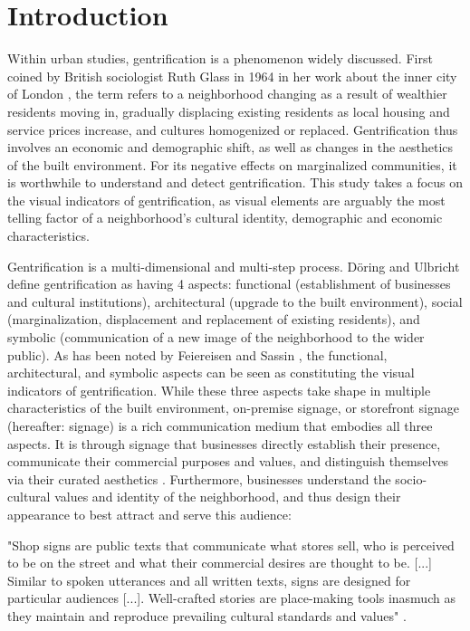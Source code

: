 \section{Introduction}
\label{sec:introduction}

Within urban studies, gentrification is a phenomenon widely discussed. First coined by British sociologist Ruth Glass in 1964 in her work about the inner city of London \cite{Glass1964}, the term refers to a neighborhood changing as a result of wealthier residents moving in, gradually displacing existing residents as local housing and service prices increase, and cultures homogenized or replaced. Gentrification thus involves an economic and demographic shift, as well as changes in the aesthetics of the built environment. For its negative effects on marginalized communities, it is worthwhile to understand and detect gentrification. This study takes a focus on the visual indicators of gentrification, as visual elements are arguably the most telling factor of a neighborhood’s cultural identity, demographic and economic characteristics.

Gentrification is a multi-dimensional and multi-step process. Döring and Ulbricht \cite{döring_ulbricht_2018} define gentrification as having 4 aspects: functional (establishment of businesses and cultural institutions), architectural (upgrade to the built environment), social (marginalization, displacement and replacement of existing residents), and symbolic (communication of a new image of the neighborhood to the wider public). As has been noted by Feiereisen and Sassin \cite{feiereisen_sounding_2021}, the functional, architectural, and symbolic aspects can be seen as constituting the visual indicators of gentrification. While these three aspects take shape in multiple characteristics of the built environment, on-premise signage, or storefront signage (hereafter: signage) is a rich communication medium that embodies all three aspects. It is through signage that businesses directly establish their presence, communicate their commercial purposes and values, and distinguish themselves via their curated aesthetics \cite{rahman_signage_2020}. Furthermore, businesses understand the socio-cultural values and identity of the neighborhood, and thus design their appearance to best attract and serve this audience:

\begin{displayquote}
    "Shop signs are public texts that communicate what stores sell, who is perceived to be on the street and what their commercial desires are thought to be. [...] Similar to spoken utterances and all written texts, signs are designed for particular audiences [...]. Well-crafted stories are place-making tools inasmuch as they maintain and reproduce prevailing cultural standards and values" \cite{trinch_signsays_2017}. 
\end{displayquote}

